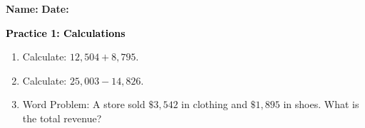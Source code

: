 \documentclass[12pt, letterpaper, fleqn]{article}
\begin{document}
\textbf{Name:} \underline{\hspace{5cm}}
\hfill
\textbf{Date:} \underline{\hspace{3cm}}\\

\begin{tcolorbox}[colback=customteal!20]
    \large\textcolor{black}{\textbf{Practice 1: Calculations}}
\end{tcolorbox}
\begin{enumerate}[itemsep=3.5cm, leftmargin=0.6cm]
\item Calculate: $12,504 + 8,795$.
\vspace{3cm}
\item Calculate: $25,003 - 14,826$.
\vspace{3cm}
\item Word Problem: A store sold $\$3,542$ in clothing and $\$1,895$ in shoes. What is the total revenue?
\end{enumerate}
\end{document}
